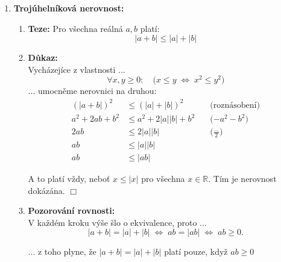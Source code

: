 \documentclass[a4paper,12pt]{article}
\begin{document}
\begin{enumerate}
  \item \textbf{Trojúhelníková nerovnost:} 
    
    \begin{enumerate}
      \item \textbf{Teze:} 
        Pro všechna reálná $a,b$ platí:
        \[
          |a+b| \le |a| + |b|
        \]
      
      \item \textbf{Důkaz:} \\
        Vycházejíce z vlastnosti ...
          \[\forall x,y \ge 0:\quad \bigl(x \le y \;\Longleftrightarrow\; x^{2} \le y^{2}\bigr)\]
        ... umocněme nerovnici na druhou:
          \begin{align*}
          (|a+b|)^2 &\le (|a| + |b|)^2 \quad &\text{(roznásobení)} \\[1ex]
          a^2 + 2ab + b^2 &\le a^2 + 2|a||b| + b^2 \quad &\text{($-a^2 - b^2$)} \\[1ex]
          2ab &\le 2|a||b| \quad &\text{($\frac{...}{2}$)} \\[1ex]
          ab &\le |a||b| \\[1ex]
          ab &\le |ab|
          \end{align*}

          A to platí vždy, neboť $x \le |x|$ pro všechna $x\in\mathbb{R}$. Tím je nerovnost dokázána. $\Box$
      
          \item \textbf{Pozorování rovnosti:} \\
            V každém kroku výše šlo o ekvivalence, proto ...
            \[
            |a+b| = |a|+|b| \;\Longleftrightarrow\; ab = |ab| \;\Longleftrightarrow\; ab\ge 0.
            \]

            ... z toho plyne, že $|a+b| = |a|+|b|$ platí pouze, když $ab \geq 0$
    \end{enumerate}
\end{enumerate}
\end{document}
